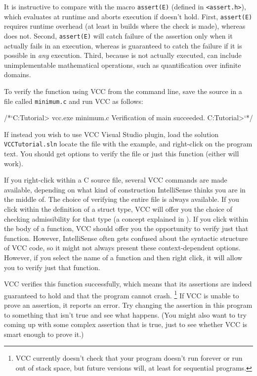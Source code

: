 \begin{note}
It is instructive to compare  with the macro
\lstinline|assert(E)| (defined in \lstinline|<assert.h>|), which
evaluates   at runtime and aborts execution if 
doesn't hold. First, \lstinline|assert(E)| requires runtime overhead (at least
in builds where the check is made), whereas  does
not. Second, \lstinline|assert(E)| will catch failure of the 
assertion only when it actually fails in an execution, whereas 
 is guaranteed to catch the failure if it is
possible in \emph{any} execution. Third, because
 is not actually executed,  can include
unimplementable mathematical operations, such as
quantification over infinite domains.
\end{note}

To verify the function using VCC from the command line, save the source in a file called \lstinline|minimum.c|
and run VCC as follows:

\begin{VCC}
/*`C:\Somewhere\VCC Tutorial> vcc.exe minimum.c
Verification of main succeeded.
C:\Somewhere\VCC Tutorial>`*/
\end{VCC}


If instead you wish to use VCC Visual Studio plugin, load the solution \lstinline|VCCTutorial.sln|
locate the file with the example, and right-click on the program text.
You should get options to verify the file or just this function (either will work).

If you right-click within a C source file,
several VCC commands are made available, depending on what kind of
construction IntelliSense thinks you are in the middle of. The choice
of verifying the entire file is always available. If you click within
the definition of a struct type, VCC will offer you the choice of
checking admissibility for that type (a concept explained in ).
If you click within the body of a function, VCC should offer
you the opportunity to verify just that function. However,
IntelliSense often gets confused about the syntactic structure of
VCC code, so it might not always present these context-dependent
options. However, if you select the name of a function and then right
click, it will allow you to verify just that function.

VCC verifies this function successfully, which means that its
assertions are indeed guaranteed to hold and that the program cannot
crash.%
\footnote{
  VCC currently doesn't check that your program doesn't run forever or
  run out of stack space, but future versions will, at least for sequential
  programs.  
}
If VCC is unable
to prove an assertion, it reports an error.  Try changing the
assertion in this program to something that isn't true and see what
happens. (You might also want to try coming up with some complex
assertion that is true, just to see whether VCC is smart enough to
prove it.)

